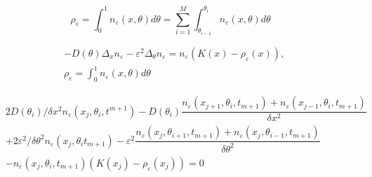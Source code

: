 \documentclass{article}
\begin{document}
$$\rho_\varepsilon = \int_0^1n_\varepsilon(x,\theta) d\theta = \sum_{i=1}^M\int_{\theta_{i-1}}^{\theta_i} n_\varepsilon(x,\theta) d\theta$$

\newpage
\begin{equation}
\begin{aligned}
&-D(\theta)\Delta_x n_\varepsilon -\varepsilon^2\Delta_\theta n_\varepsilon = n_\varepsilon(K(x)-\rho_\varepsilon(x)),\\
&\rho_\varepsilon = \int_0^1n_\varepsilon(x,\theta) d\theta
\end{aligned}
\end{equation}

\begin{equation}
\begin{aligned}
&2D(\theta_i)/\delta x^2n_\varepsilon(x_j, \theta_i, t^{m+1}) - D(\theta_i)\dfrac{n_\varepsilon(x_{j+1}, \theta_i, t_{m+1})  + n_\varepsilon(x_{j-1}, \theta_i, t_{m+1})}{\delta x^2}\\
& + 2\varepsilon^2 /\delta \theta^2 n_\varepsilon(x_j,\theta_i t_{m+1})
-\varepsilon^2 \dfrac{n_\varepsilon(x_j, \theta_{i+1}, t_{m+1}) + n_\varepsilon(x_j, \theta_{i-1}, t_{m+1})}{\delta\theta^2} \\
& -n_\varepsilon(x_j, \theta_i, t_{m+1}) \left(K(x_j) - \rho_\varepsilon(x_j)\right) = 0
\end{aligned}
\end{equation}
\end{document}
